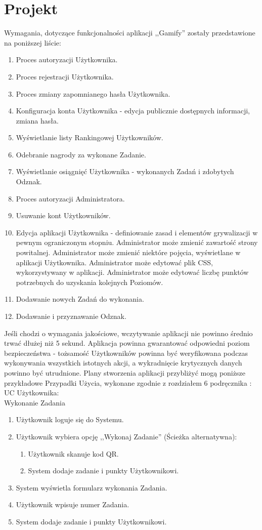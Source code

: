 \documentclass[a4paper,12pt,twoside,openany]{report}
\begin{document}
	\section{Projekt}
	Wymagania, dotyczące funkcjonalności aplikacji ,,Gamify'' zostały przedstawione na poniższej liście:
	\begin{enumerate}
	\item Proces autoryzacji Użytkownika.
	\item Proces rejestracji Użytkownika.
	\item Proces zmiany zapomnianego hasła Użytkownika.
	\item Konfiguracja konta Użytkownika - edycja publicznie dostępnych informacji, zmiana hasła.
	\item Wyświetlanie listy Rankingowej Użytkowników.
	\item Odebranie nagrody za wykonane Zadanie.
	\item Wyświetlanie osiągnięć Użytkownika  - wykonanych Zadań i zdobytych Odznak.
	\item Proces autoryzacji Administratora.
	\item Usuwanie kont Użytkowników.
	\item Edycja aplikacji Użytkownika - definiowanie zasad i elementów grywalizacji w pewnym ograniczonym stopniu. Administrator może zmienić zawartość strony powitalnej. Administrator może zmienić niektóre pojęcia, wyświetlane w aplikacji Użytkownika. Administrator może edytować plik CSS, wykorzystywany w aplikacji. Administrator może edytować liczbę punktów potrzebnych do uzyskania kolejnych Poziomów.
	\item Dodawanie nowych Zadań do wykonania.
	\item Dodawanie i przyznawanie Odznak.
	\end{enumerate}
	Jeśli chodzi o wymagania jakościowe, wczytywanie aplikacji nie powinno średnio trwać dłużej niż 5 sekund. Aplikacja powinna gwarantować odpowiedni poziom bezpieczeństwa - tożsamość Użytkowników powinna być weryfikowana podczas wykonywania wszystkich istotnych akcji, a wykradnięcie krytycznych danych powinno być utrudnione.
	Plany stworzenia aplikacji przybliżyć mogą poniższe przykładowe Przypadki Użycia, wykonane zgodnie z rozdziałem 6 podręcznika \cite{Smialek}:\\
	UC Użytkownika:\\
	Wykonanie Zadania
	\begin{enumerate}
		\item Użytkownik loguje się do Systemu.
		\item Użytkownik wybiera opcję ,,Wykonaj Zadanie'' (Ścieżka alternatywna):
		\begin{enumerate}
		\item Użytkownik skanuje kod QR.
		\item System dodaje zadanie i punkty Użytkownikowi.
		\end{enumerate}
		\item System wyświetla formularz wykonania Zadania.
		\item Użytkownik wpisuje numer Zadania.
		\item System dodaje zadanie i punkty Użytkownikowi.
	\end{enumerate}
\end{document}
